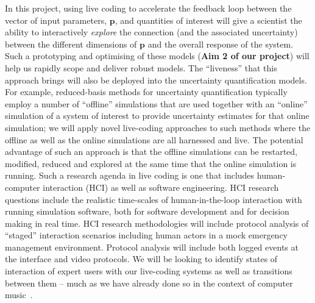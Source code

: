 In this project, using live coding to accelerate the feedback loop between the vector of input parameters,
$\mathbf{p}$,  and quantities of interest  will give a scientist the ability to interactively
\emph{explore} the connection (and the associated uncertainty) between
the different dimensions of $\mathbf{p}$ and the overall response of
the system. Such a prototyping and optimising of these models ({\bf Aim 2 of our project}) will help us rapidly scope and deliver 
robust models. The ``liveness'' that this approach brings will also be deployed 
into the uncertainty quantification models. For example, reduced-basis methods for uncertainty 
quantification typically employ a number of ``offline'' simulations that are used together with an ``online'' simulation of 
a system of interest to provide uncertainty estimates for that online simulation; we will apply novel live-coding
approaches to such methods where the offline as well as the online simulations are all harnessed and live. The 
potential advantage of such an approach is that the offline simulations can be restarted, modified, reduced and 
explored at the same time that the online simulation is running. Such a research agenda in live coding is one that 
includes human-computer interaction (HCI) as well as software engineering. HCI research questions include the realistic time-scales of 
human-in-the-loop interaction with running simulation software, both for software development and for decision making in real time.
HCI research methodologies will include protocol analysis of ``staged'' interaction scenarios including
human actors in a mock emergency management environment. Protocol analysis will include both logged events at the interface and 
video protocols. 
We will be looking to identify states of interaction 
of expert users with our live-coding systems as well as transitions between them -- much as we have already done so in the 
context of computer music~\parencite{swift2014coding}.







